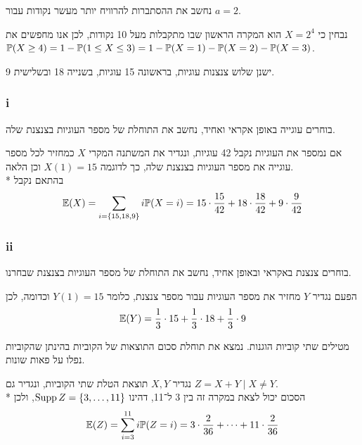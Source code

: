 \subquestion{}
נחשב את ההסתברות להרוויח יותר מעשר נקודות עבור $a = 2$.
\begin{solution}
	נבחין כי $X = 2^4$ הוא המקרה הראשון שבו מתקבלות מעל 10 נקודות, לכן אנו מחפשים את $\mathbb{P}(X \ge 4) = 1 - \mathbb{P}(1 \le X \le 3) = 1 - \mathbb{P}(X = 1) - \mathbb{P}(X = 2) - \mathbb{P}(X = 3)$.
\end{solution}

\question{}
\subquestion{}
ישנן שלוש צנצנות עוגיות, בראשונה 15 עוגיות, בשנייה 18 ובשלישית 9.

\subsubsection{i}
בוחרים עוגייה באופן אקראי ואחיד, נחשב את התוחלת של מספר העוגיות בצנצנת שלה.
\begin{solution}
	אם נמספר את העוגיות נקבל 42 עוגיות, ונגדיר את המשתנה המקרי $X$ כמחזיר לכל מספר עוגייה את מספר העוגיות בצנצנת שלה, כך לדוגמה $X(1) = 15$ וכן הלאה. \\*
	בהתאם נקבל
	\[
		\mathbb{E}(X)
		= \sum_{i = \{15, 18, 9\}} i \mathbb{P}(X = i)
		= 15 \cdot \frac{15}{42} + 18 \cdot \frac{18}{42} + 9 \cdot \frac{9}{42}
	\]
\end{solution}

\subsubsection{ii}
בוחרים צנצנת באקראי ובאופן אחיד, נחשב את התוחלת של מספר העוגיות בצנצנת שבחרנו.
\begin{solution}
	הפעם נגדיר $Y$ מחזיר את מספר העוגיות עבור מספר צנצנת, כלומר $Y(1) = 15$ וכדומה, לכן
	\[
		\mathbb{E}(Y) = \frac{1}{3} \cdot 15 + \frac{1}{3} \cdot 18 + \frac{1}{3} \cdot 9
	\]
\end{solution}

\subquestion{}
מטילים שתי קוביות הוגנות.
נמצא את תוחלת סכום התוצאות של הקוביות בהינתן שהקוביות נפלו על פאות שונות.
\begin{solution}
	נגדיר $X, Y$ תוצאת הטלת שתי הקוביות, ונגדיר גם $Z = X + Y \mid X \ne Y$. \\*
	הסכום יכול לצאת במקרה זה בין 3 ל־11, דהינו $\operatorname{Supp} Z = \{3, \dots, 11\}$, ולכן
	\[
		\mathbb{E}(Z)
		= \sum_{i = 3}^{11} i \mathbb{P}(Z = i)
		= 3 \cdot \frac{2}{36} + \cdots + 11 \cdot \frac{2}{36}
	\]
\end{solution}

